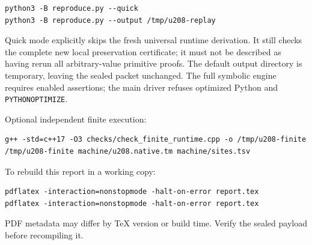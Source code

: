 \documentclass[11pt,letterpaper]{article}
\newcommand{\code}[1]{\texttt{#1}}
\begin{document}
\begin{lstlisting}
python3 -B reproduce.py --quick
python3 -B reproduce.py --output /tmp/u208-replay
\end{lstlisting}
Quick mode explicitly skips the fresh universal runtime derivation.
It still checks the complete new local preservation certificate; it must
not be described as having rerun all arbitrary-value primitive proofs.
The default output directory is temporary, leaving the sealed packet
unchanged. The full symbolic engine requires enabled assertions; the main
driver refuses optimized Python and \code{PYTHONOPTIMIZE}.

Optional independent finite execution:
\begin{lstlisting}
g++ -std=c++17 -O3 checks/check_finite_runtime.cpp -o /tmp/u208-finite
/tmp/u208-finite machine/u208.native.tm machine/sites.tsv
\end{lstlisting}

To rebuild this report in a working copy:
\begin{lstlisting}
pdflatex -interaction=nonstopmode -halt-on-error report.tex
pdflatex -interaction=nonstopmode -halt-on-error report.tex
\end{lstlisting}
PDF metadata may differ by TeX version or build time. Verify the sealed
payload before recompiling it.
\end{document}
